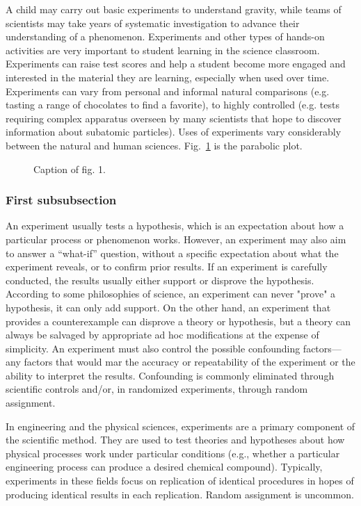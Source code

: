 \documentclass[11pt, a4paper]{article}
\begin{document}
A child may carry out basic experiments to understand gravity, while teams of scientists may take years of systematic investigation to advance their understanding of a phenomenon. Experiments and other types of hands-on activities are very important to student learning in the science classroom. Experiments can raise test scores and help a student become more engaged and interested in the material they are learning, especially when used over time. Experiments can vary from personal and informal natural comparisons (e.g. tasting a range of chocolates to find a favorite), to highly controlled (e.g. tests requiring complex apparatus overseen by many scientists that hope to discover information about subatomic particles). Uses of experiments vary considerably between the natural and human sciences. Fig.~\ref{fig:parabolic} is the parabolic plot.

\begin{figure}
	\centering
	\caption{Caption of fig. 1.}
	\label{fig:parabolic}
\end{figure}

\subsubsection{First subsubsection}
An experiment usually tests a hypothesis, which is an expectation about how a particular process or phenomenon works. However, an experiment may also aim to answer a ``what-if'' question, without a specific expectation about what the experiment reveals, or to confirm prior results. If an experiment is carefully conducted, the results usually either support or disprove the hypothesis. According to some philosophies of science, an experiment can never "prove" a hypothesis, it can only add support. On the other hand, an experiment that provides a counterexample can disprove a theory or hypothesis, but a theory can always be salvaged by appropriate ad hoc modifications at the expense of simplicity. An experiment must also control the possible confounding factors—any factors that would mar the accuracy or repeatability of the experiment or the ability to interpret the results. Confounding is commonly eliminated through scientific controls and/or, in randomized experiments, through random assignment.

In engineering and the physical sciences, experiments are a primary component of the scientific method. They are used to test theories and hypotheses about how physical processes work under particular conditions (e.g., whether a particular engineering process can produce a desired chemical compound). Typically, experiments in these fields focus on replication of identical procedures in hopes of producing identical results in each replication. Random assignment is uncommon.
\end{document}
